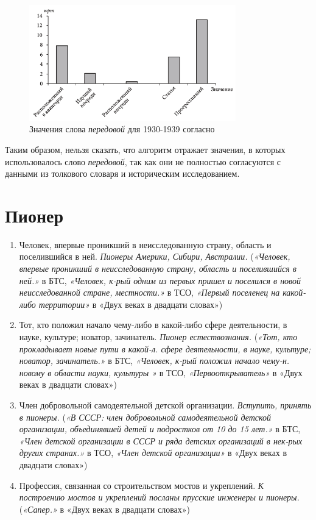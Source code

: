 \begin{figure}[H]
    \centering %
    \includegraphics[width=0.8\textwidth]{img/book/peredovoj/1930-1939}
    \caption{Значения слова \textit{передовой} для 1930-1939 согласно~\cite{TwoCenturies}}
    \label{fig:TwoCenturiesPeredovoj2}
\end{figure}

Таким образом, нельзя сказать, что алгоритм отражает значения, в которых использовалось
слово \textit{передовой}, так как они не полностью согласуются
с данными из толкового словаря и историческим исследованием.

\section*{Пионер}

\begin{enumerate}
    \item Человек, впервые проникший в неисследованную страну, область и поселившийся в ней. \textit{Пионеры Америки, Сибири, Австралии.}
(\textit{«Человек, впервые проникший в неисследованную страну, область и поселившийся в ней.»} в БТС,
\textit{«Человек, к-рый одним из первых пришел и поселился в новой неисследованной стране, местности.»} в ТСО,
\textit{«Первый поселенец на какой-либо территории»} в «Двух веках в двадцати словах»)

    \item Тот, кто положил начало чему-либо в какой-либо сфере деятельности, в науке, культуре; новатор, зачинатель. \textit{Пионер естествознания.}
(\textit{«Тот, кто прокладывает новые пути в какой-л. сфере деятельности, в науке, культуре; новатор, зачинатель.»} в БТС,
\textit{«Человек, к-рый положил начало чему-н. новому в области науки, культуры »} в ТСО,
\textit{«Первооткрыватель»} в «Двух веках в двадцати словах»)

    \item Член добровольной самодеятельной детской организации. \textit{Вступить, принять в пионеры.}
(\textit{«В СССР: член добровольной самодеятельной детской организации, объединявшей детей и подростков от 10 до 15 лет.»} в БТС,
\textit{«Член детской организации в СССР и ряда детских организаций в нек-рых других странах.»} в ТСО,
\textit{«Член детской организации»} в «Двух веках в двадцати словах»)

    \item Профессия, связанная со строительством мостов и укреплений. \textit{К построению мостов и укреплений посланы прусские инженеры и пионеры.}
(\textit{«Сапер.»} в «Двух веках в двадцати словах»)
\end{enumerate}

